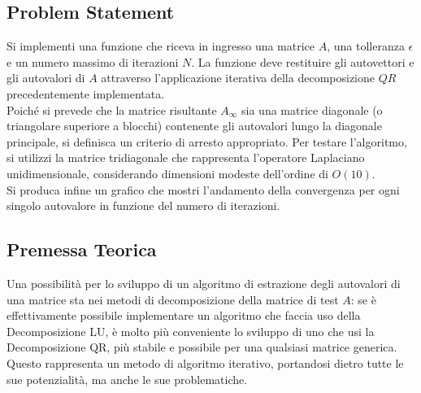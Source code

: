\subsection{Problem Statement}
Si implementi una funzione che riceva in ingresso una matrice $A$, una tolleranza $\epsilon$ e un numero massimo di iterazioni $N$. La funzione deve restituire gli autovettori e gli autovalori di $A$ attraverso l'applicazione iterativa della decomposizione $QR$ precedentemente implementata.\\
Poiché si prevede che la matrice risultante $A_\infty$ sia una matrice diagonale (o triangolare superiore a blocchi) contenente gli autovalori lungo la diagonale principale, si definisca un criterio di arresto appropriato. Per testare l'algoritmo, si utilizzi la matrice tridiagonale che rappresenta l'operatore Laplaciano unidimensionale, considerando dimensioni modeste dell'ordine di $O(10)$.\\
Si produca infine un grafico che mostri l'andamento della convergenza per ogni singolo autovalore in funzione del numero di iterazioni.

\subsection{Premessa Teorica}
Una possibilità per lo sviluppo di un algoritmo di estrazione degli autovalori di una matrice sta nei metodi di decomposizione della matrice di test $A$: se è effettivamente possibile implementare un algoritmo che faccia uso della Decomposizione LU, è molto più conveniente lo sviluppo di uno che usi la Decomposizione QR, più stabile e possibile per una qualsiasi matrice generica. Questo rappresenta un metodo di algoritmo iterativo, portandosi dietro tutte le sue potenzialità, ma anche le sue problematiche.

